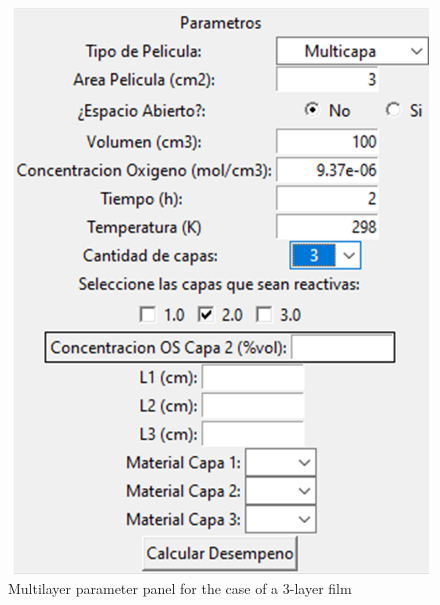 \begin{refsection}
\begin{figure}[H]
    \centering
    \includegraphics[scale=0.6]{Documento_Latex/Tesis_1/Imagenes/multilayer_panel.png}
    \caption{Multilayer parameter panel for the case of a 3-layer film}
    \label{fig:multilayer_panel}
\end{figure}

\printbibliography
\end{refsection}